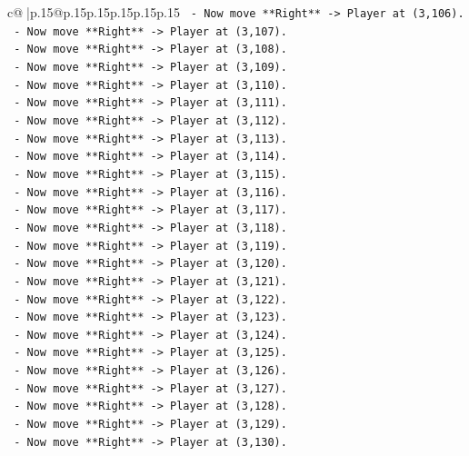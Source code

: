 \documentclass{article}
\begin{document}
{\begin{supertabular}{c@{$\;$}|p{.15\linewidth}@{}p{.15\linewidth}p{.15\linewidth}p{.15\linewidth}p{.15\linewidth}p{.15\linewidth}}
{{{\texttt{    {-}   Now move **Right** {-}> Player at (3,106).} \\
\texttt{    {-}   Now move **Right** {-}> Player at (3,107).} \\
\texttt{    {-}   Now move **Right** {-}> Player at (3,108).} \\
\texttt{    {-}   Now move **Right** {-}> Player at (3,109).} \\
\texttt{    {-}   Now move **Right** {-}> Player at (3,110).} \\
\texttt{    {-}   Now move **Right** {-}> Player at (3,111).} \\
\texttt{    {-}   Now move **Right** {-}> Player at (3,112).} \\
\texttt{    {-}   Now move **Right** {-}> Player at (3,113).} \\
\texttt{    {-}   Now move **Right** {-}> Player at (3,114).} \\
\texttt{    {-}   Now move **Right** {-}> Player at (3,115).} \\
\texttt{    {-}   Now move **Right** {-}> Player at (3,116).} \\
\texttt{    {-}   Now move **Right** {-}> Player at (3,117).} \\
\texttt{    {-}   Now move **Right** {-}> Player at (3,118).} \\
\texttt{    {-}   Now move **Right** {-}> Player at (3,119).} \\
\texttt{    {-}   Now move **Right** {-}> Player at (3,120).} \\
\texttt{    {-}   Now move **Right** {-}> Player at (3,121).} \\
\texttt{    {-}   Now move **Right** {-}> Player at (3,122).} \\
\texttt{    {-}   Now move **Right** {-}> Player at (3,123).} \\
\texttt{    {-}   Now move **Right** {-}> Player at (3,124).} \\
\texttt{    {-}   Now move **Right** {-}> Player at (3,125).} \\
\texttt{    {-}   Now move **Right** {-}> Player at (3,126).} \\
\texttt{    {-}   Now move **Right** {-}> Player at (3,127).} \\
\texttt{    {-}   Now move **Right** {-}> Player at (3,128).} \\
\texttt{    {-}   Now move **Right** {-}> Player at (3,129).} \\
\texttt{    {-}   Now move **Right** {-}> Player at (3,130).} \\
}}}
\end{supertabular}}
\end{document}

